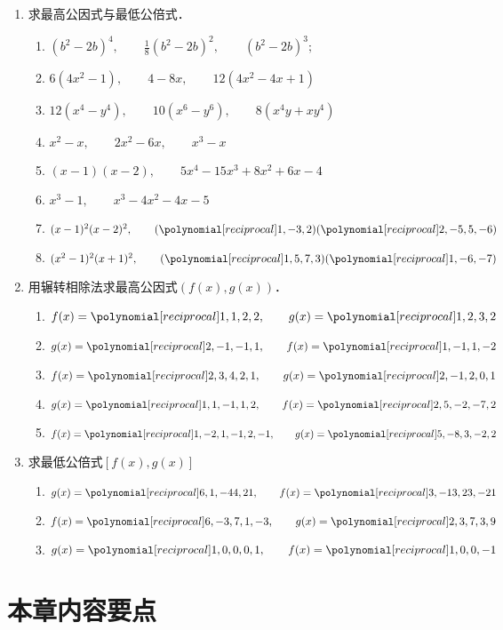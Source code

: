 \begin{enumerate}
\item 求最高公因式与最低公倍式．
\begin{enumerate}
\item $\left(b^{2}-2 b\right)^{4},\qquad   \frac{1}{8}\left(b^{2}-2 b\right)^{2},\qquad  \left(b^{2}-2 b\right)^{3} ;$
\item $6\left(4 x^{2}-1\right),\qquad   4-8 x ,\qquad   12\left(4 x^{2}-4 x + 1\right)$
\item $12\left(x^{4}-y^{4}\right),\qquad   10\left(x^{6}-y^{6}\right),\qquad   8\left(x^{4} y+x y^{4}\right)$
\item $x^{2}-x, \qquad  2 x^{2}-6 x,\qquad   x^{3}-x$
\item $(x-1)(x-2),\qquad   5 x^{4}-15 x^{3}+8 x^{2}+6 x-4$
\item $x^{3}-1,\qquad   x^{3}-4 x^{2}-4 x-5$
\item $(x-1)^{2}(x-2)^{2},\qquad (\poly{1,-3,2})(\poly{2,-5,5,-6})$
\item $(x^2-1)^2(x+1)^2,\qquad (\poly{1,5,7,3})(\poly{1,-6,-7})$
\end{enumerate}

\item 用辗转相除法求最高公因式$(f(x),g(x))$．
\begin{enumerate}
    \item $f(x)=\poly{1,1,2,2},\qquad g(x)=\poly{1,2,3,2}$
    \item $g(x)=\poly{2,-1,-1,1},\qquad f(x)=\poly{1,-1,1,-2}$
    \item $f(x)=\poly{2,3,4,2,1},\qquad g(x)=\poly{2,-1,2,0,1}$
    \item $g(x)=\poly{1,1,-1,1,2},\qquad f(x)=\poly{2,5,-2,-7,2}$
    \item $f(x)=\poly{1,-2,1,-1,2,-1},\qquad g(x)=\poly{5,-8,3,-2,2}$
\end{enumerate}

\item 求最低公倍式$[f(x),g(x)]$
\begin{enumerate}
    \item $g(x)=\poly{6,1,-44,21},\qquad f(x)=\poly{3,-13,23,-21}$
    \item $f(x)=\poly{6,-3,7,1,-3},\qquad g(x)=\poly{2,3,7,3,9}$
    \item $g(x)=\poly{1,0,0,0,1},\qquad f(x)=\poly{1,0,0,-1}$
\end{enumerate}

\end{enumerate}

\section*{本章内容要点}

